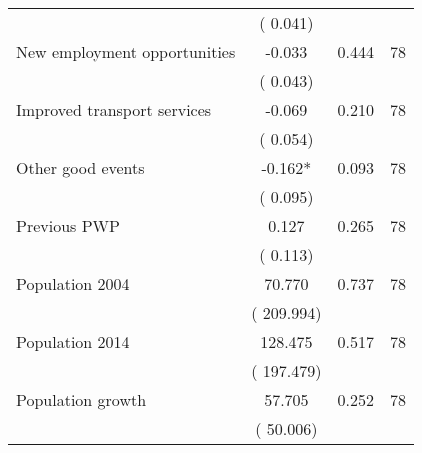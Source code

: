 \begin{tabular}{l*{3}{c}}
                               &        (       0.041)            &                               &                               \\ 
 New employment opportunities                &             -0.033        &        0.444   & 78              \\ 
                               &        (       0.043)            &                               &                               \\ 
 Improved transport services                &             -0.069        &        0.210   & 78              \\ 
                               &        (       0.054)            &                               &                               \\ 
 Other good events                &             -0.162*        &        0.093   & 78              \\ 
                               &        (       0.095)            &                               &                               \\ 
 Previous PWP                &              0.127        &        0.265   & 78              \\ 
                               &        (       0.113)            &                               &                               \\ 
 Population 2004                &             70.770        &        0.737   & 78              \\ 
                               &        (     209.994)            &                               &                               \\ 
 Population 2014                &            128.475        &        0.517   & 78              \\ 
                               &        (     197.479)            &                               &                               \\ 
 Population growth                &             57.705        &        0.252   & 78              \\ 
                               &        (      50.006)            &                               &                               \\ 
\hline \end{tabular}                                                                                              
